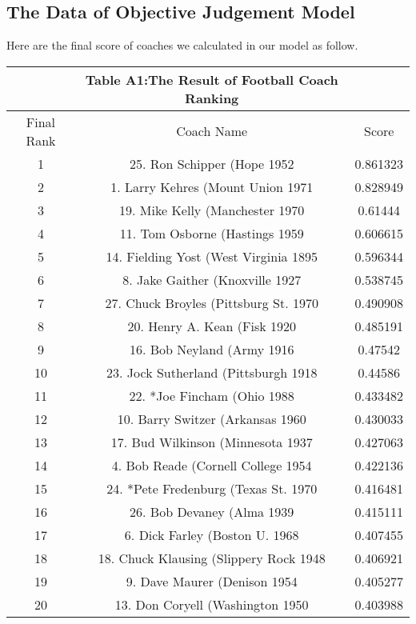 \documentclass{mcmthesis}
\begin{document}
\begin{appendices}
\section{The Data of Objective Judgement Model}
\par Here are the final score of coaches we  calculated in our model as follow.
\begin{longtable}{ccc}
 &Table A1:The Result of Football Coach Ranking&\\
 \hline
Final Rank & Coach Name & Score\\
\hline
\endhead

1     & 25. Ron Schipper (Hope 1952 & 0.861323 \\
    2     & 1. Larry Kehres (Mount Union 1971 & 0.828949 \\
    3     & 19. Mike Kelly (Manchester 1970 & 0.61444 \\
    4     & 11. Tom Osborne (Hastings 1959 & 0.606615 \\
    5     & 14. Fielding Yost (West Virginia 1895 & 0.596344 \\
    6     & 8. Jake Gaither (Knoxville 1927 & 0.538745 \\
    7     & 27. Chuck Broyles (Pittsburg St. 1970 & 0.490908 \\
    8     & 20. Henry A. Kean (Fisk 1920 & 0.485191 \\
    9     & 16. Bob Neyland (Army 1916 & 0.47542 \\
    10    & 23. Jock Sutherland (Pittsburgh 1918 & 0.44586 \\
    11    & 22. *Joe Fincham (Ohio 1988 & 0.433482 \\
    12    & 10. Barry Switzer (Arkansas 1960 & 0.430033 \\
    13    & 17. Bud Wilkinson (Minnesota 1937 & 0.427063 \\
    14    & 4. Bob Reade (Cornell College 1954 & 0.422136 \\
    15    & 24. *Pete Fredenburg (Texas St. 1970 & 0.416481 \\
    16    & 26. Bob Devaney (Alma 1939 & 0.415111 \\
    17    & 6. Dick Farley (Boston U. 1968 & 0.407455 \\
    18    & 18. Chuck Klausing (Slippery Rock 1948 & 0.406921 \\
    19    & 9. Dave Maurer (Denison 1954 & 0.405277 \\
    20    & 13. Don Coryell (Washington 1950 & 0.403988 \\

\end{longtable}
\end{appendices}
\end{document}
